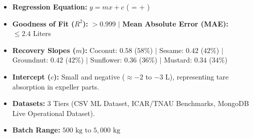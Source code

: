 \documentclass[11pt,a4paper]{article}
\begin{document}
\begin{summarybox}
\begin{itemize}[leftmargin=1.2em]
    \item \textbf{Regression Equation:} $y = mx + c$ \quad ( =  \times {} + )
    \item \textbf{Goodness of Fit ($R^2$):} $> 0.999$ \quad $|$ \quad \textbf{Mean Absolute Error (MAE):} $\le 2.4\text{ Liters}$
    \item \textbf{Recovery Slopes ($m$):} Coconut: $\mathbf{0.58}$ ($58\%$) \quad$|$ \quad Sesame: $\mathbf{0.42}$ ($42\%$) \quad$|$ \quad Groundnut: $\mathbf{0.42}$ ($42\%$) \quad$|$ \quad Sunflower: $\mathbf{0.36}$ ($36\%$) \quad$|$ \quad Mustard: $\mathbf{0.34}$ ($34\%$)
    \item \textbf{Intercept ($c$):} Small and negative ($\approx -2$ to $-3\text{ L}$), representing tare absorption in expeller parts.
    \item \textbf{Datasets:} 3 Tiers (CSV ML Dataset, ICAR/TNAU Benchmarks, MongoDB Live Operational Dataset).
    \item \textbf{Batch Range:} $500\text{ kg to } 5,000\text{ kg}$
\end{itemize}
\end{summarybox}
\end{document}
